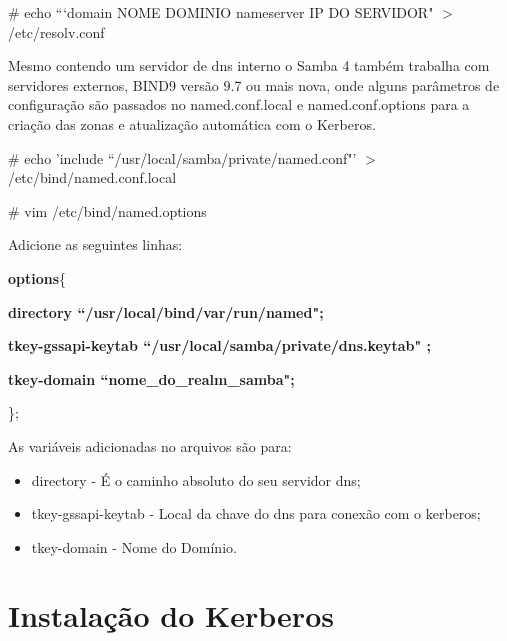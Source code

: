 \# echo ```domain NOME DOMINIO nameserver IP DO SERVIDOR"  $>$ /etc/resolv.conf

Mesmo contendo um servidor de dns interno o Samba 4 também trabalha com servidores externos, BIND9 versão 9.7 ou mais nova, onde alguns parâmetros de configuração são passados no named.conf.local e named.conf.options para a criação das zonas e atualização automática com o Kerberos.

\# echo 'include ``/usr/local/samba/private/named.conf"' $>$ /etc/bind/named.conf.local

\# vim /etc/bind/named.options

Adicione as seguintes linhas:

\textbf{options}\{ 
	
\textbf{directory ``/usr/local/bind/var/run/named"; }

\textbf{tkey-gssapi-keytab ``/usr/local/samba/private/dns.keytab" ; }

\textbf{tkey-domain ``nome\_do\_realm\_samba"; }
	
\};

As variáveis adicionadas no arquivos são para:

\begin{itemize}
	\item{directory} -  É o caminho absoluto do seu servidor dns;
	\item{tkey-gssapi-keytab} - Local da chave do dns para conexão com o kerberos;
	\item{tkey-domain} - Nome do Domínio.
\end{itemize}

\section{Instalação do Kerberos}


